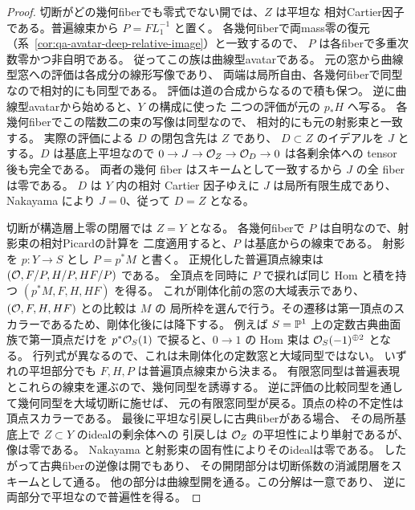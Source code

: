 \begin{proof}
切断がどの幾何fiberでも零式でない開では、$Z$ は平坦な
相対Cartier因子である。普遍線束から $P=F L_1^{-1}$ と置く。
各幾何fiberで両mass零の復元
（系~\ref{cor:qa-avatar-deep-relative-image}）と一致するので、
$P$ は各fiberで多重次数零かつ非自明である。
従ってこの族は曲線型avatarである。
元の窓から曲線型窓への評価は各成分の線形写像であり、
両端は局所自由、各幾何fiberで同型なので相対的にも同型である。
評価は道の合成からなるので積も保つ。
逆に曲線型avatarから始めると、$Y$ の構成に使った
二つの評価が元の $p_*H$ へ写る。
各幾何fiberでこの階数二の束の写像は同型なので、
相対的にも元の射影束と一致する。
実際の評価による $D$ の閉包含先は $Z$ であり、
$D\subset Z$ のイデアルを $J$ とする。$D$ は基底上平坦なので
$0\to J\to\mathcal O_Z\to\mathcal O_D\to0$ は各剰余体への tensor 後も完全である。
両者の幾何 fiber はスキームとして一致するから $J$ の全 fiber は零である。
$D$ は $Y$ 内の相対 Cartier 因子ゆえに $J$ は局所有限生成であり、
Nakayama により $J=0$、従って $D=Z$ となる。

切断が構造層上零の閉層では $Z=Y$ となる。
各幾何fiberで $P$ は自明なので、射影束の相対Picardの計算を
二度適用すると、$P$ は基底からの線束である。
射影を $p:Y\to S$ とし $P=p^*M$ と書く。
正規化した普遍頂点線束は $(\mathcal O,F/P,H/P,HF/P)$ である。
全頂点を同時に $P$ で捩れば同じ Hom と積を持つ $(p^*M,F,H,HF)$ を得る。
これが剛体化前の窓の大域表示であり、$(\mathcal O,F,H,HF)$ との比較は $M$ の
局所枠を選んで行う。その遷移は第一頂点のスカラーであるため、剛体化後には降下する。
例えば $S=\mathbb P^1$ 上の定数古典曲面族で第一頂点だけを $p^*\mathcal O_S(1)$
で捩ると、$0\to1$ の Hom 束は $\mathcal O_S(-1)^{\oplus2}$ となる。
行列式が異なるので、これは未剛体化の定数窓と大域同型ではない。
いずれの平坦部分でも $F,H,P$ は普遍頂点線束から決まる。
有限窓同型は普遍表現とこれらの線束を運ぶので、幾何同型を誘導する。
逆に評価の比較同型を通して幾何同型を大域切断に施せば、
元の有限窓同型が戻る。頂点の枠の不定性は頂点スカラーである。
最後に平坦な引戻しに古典fiberがある場合、
その局所基底上で $Z\subset Y$ のidealの剰余体への
引戻しは $\mathcal O_Z$ の平坦性により単射であるが、像は零である。
Nakayama と射影束の固有性によりそのidealは零である。
したがって古典fiberの逆像は開でもあり、
その開閉部分は切断係数の消滅閉層をスキームとして通る。
他の部分は曲線型開を通る。この分解は一意であり、
逆に両部分で平坦なので普遍性を得る。
\end{proof}

